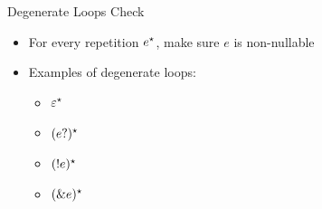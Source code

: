 \documentclass{beamer}
\begin{document}
\begin{frame}{Degenerate Loops Check}
    \begin{itemize}
        \item For every repetition $e^\star$, make sure $e$ is non-nullable
    \end{itemize}
    \begin{itemize}
        \item Examples of degenerate loops:
        \begin{itemize}
            \item $\varepsilon^\star$
            \item $(e?)^\star$
            \item $(!e)^\star$
            \item $(\&e)^\star$
        \end{itemize}
    \end{itemize}
\end{frame}
\end{document}
